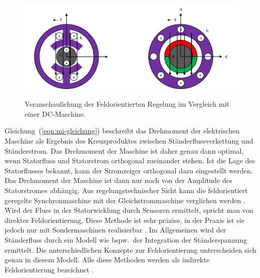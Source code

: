 \begin{figure}[h!]
	\centering
	\includegraphics{_Bilder/foc-dc-ac.pdf}
	\label{fig:foc-dc-ac}
	\caption{Veranschaulichung der Feldorientierten Regelung im Vergleich mit einer DC-Maschine.}
\end{figure}

Gleichung~(\ref{eqn:mi-gleichung}) beschreibt das Drehmoment der elektrischen Maschine als Ergebnis des Kreuzproduktes zwischen Ständerflussverkettung und Ständerstrom.
Das Drehmoment der Maschine ist daher genau dann optimal, wenn Statorfluss und Statorstrom orthogonal zueinander stehen.
Ist die Lage des Statorflusses bekannt, kann der Stromzeiger orthogonal dazu eingestellt werden.
Das Drehmoment der Maschine ist dann nur noch von der Amplitude des Statorstromes abhängig.
Aus regelungstechnischer Sicht kann die feldorientiert geregelte Synchronmaschine mit der Gleichstrommaschine verglichen werden \autocite{Thur2006}.
Wird der Fluss in der Statorwicklung durch Sensoren ermittelt, spricht man von direkter Feldorientierung.
Diese Methode ist sehr präzise, in der Praxis ist sie jedoch nur mit Sondermaschinen realisierbar \autocite{Thur2006}.
Im Allgemeinen wird der Ständerfluss durch ein Modell wie bspw.\ der Integration der Ständerspannung ermittelt.
Die unterschiedlichen Konzepte zur Feldorientierung unterscheiden sich genau in diesem Modell.
Alle diese Methoden werden als indirekte Feldorientierung bezeichnet \autocite{Thur2006}.

